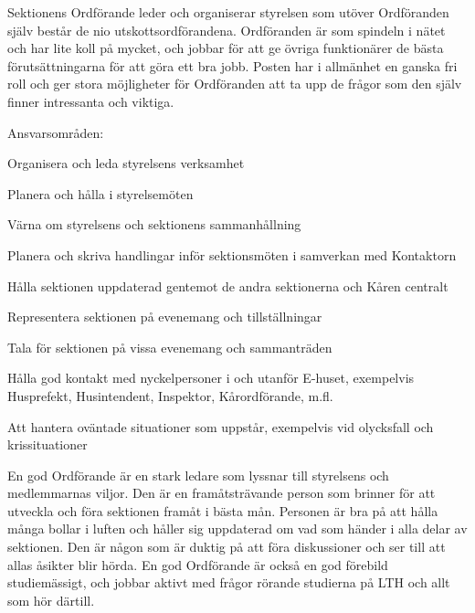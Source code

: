 \documentclass[10pt]{article}
\def\post{Ordförande}
\def\doctitle{Kravprofil för \post}
\begin{document}
\heading{\doctitle}


Sektionens Ordförande leder och organiserar styrelsen som utöver Ordföranden själv består de nio utskottsordförandena.
Ordföranden är som spindeln i nätet och har lite koll på mycket, och jobbar för att ge övriga funktionärer de bästa förutsättningarna för att göra ett bra jobb.
Posten har i allmänhet en ganska fri roll och ger stora möjligheter för Ordföranden att ta upp de frågor som den själv finner intressanta och viktiga.


Ansvarsområden:
\begin{dashlist}
    \item Organisera och leda styrelsens verksamhet
    \item Planera och hålla i styrelsemöten
    \item Värna om styrelsens och sektionens sammanhållning
    \item Planera och skriva handlingar inför sektionsmöten i samverkan med Kontaktorn
    \item Hålla sektionen uppdaterad gentemot de andra sektionerna och Kåren centralt
    \item Representera sektionen på evenemang och tillställningar
    \item Tala för sektionen på vissa evenemang och sammanträden
    \item Hålla god kontakt med nyckelpersoner i och utanför E-huset, exempelvis Husprefekt, Husintendent, Inspektor, Kårordförande, m.fl.
    \item Att hantera oväntade situationer som uppstår, exempelvis vid olycksfall och krissituationer
\end{dashlist}


En god Ordförande är en stark ledare som lyssnar till styrelsens och medlemmarnas viljor.
Den är en framåtsträvande person som brinner för att utveckla och föra sektionen framåt i bästa mån.
Personen är bra på att hålla många bollar i luften och håller sig uppdaterad om vad som händer i alla delar av sektionen.
Den är någon som är duktig på att föra diskussioner och ser till att allas åsikter blir hörda.
En god Ordförande är också en god förebild studiemässigt, och jobbar aktivt med frågor rörande studierna på LTH och allt som hör därtill.
\end{document}
